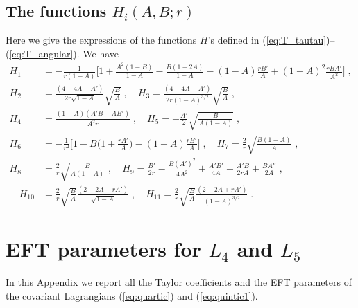 \documentclass[a4paper,11pt]{article}
\numberwithin{equation}{section}
\begin{document}
\subsection{The functions $H_i(A,B;r)$}\label{app:functions_H}
Here we give the expressions of the functions $H$'s defined in (\ref{eq:T_tautau})--(\ref{eq:T_angular}). We have 
\begin{align}
H_1 &=  -\frac{1}{r(1 - A)} \bigg[ 1 + \frac{A^2 (1 - B)}{1 - A} - \frac{B(1 - 2A)}{1 - A} - (1- A) \frac{r B'}{A} + (1 - A)^2 \frac{r B A'}{A^2}\bigg] \;, \nonumber \\
H_2 &= \frac{(4 -  4A - A')}{2 r \sqrt{1 - A}} \sqrt{\frac{B}{A}}  \;, \quad H_3 = \frac{(4 -  4A + A')}{2 r (1 - A)^{3/2}} \sqrt{\frac{B}{A}} \;,  \nonumber \\
H_4 &= \frac{(1 - A)(A'B - AB')}{A^2 r} \;, \quad H_5 = - \frac{A'}{2}\sqrt{\frac{B}{A(1 - A)}} \;, \\
H_6 &= -\frac{1}{r^2}\bigg[1 - B \bigg(1 + \frac{r A'}{A}\bigg) - (1 - A)\frac{r B'}{A}  \bigg] \;, \quad H_7 = \frac{2}{r} \sqrt{\frac{B(1 - A)}{A}} \;,  \nonumber \\
H_8 &= \frac{2}{r} \sqrt{\frac{B}{A(1 - A)}}  \;, \quad H_9 = \frac{B'}{2r} - \frac{B (A')^2}{4A^2} + \frac{A'B'}{4A} + \frac{A'B}{2 rA} + \frac{B A''}{2 A}  \;,   \nonumber \\  
\quad H_{10} &= \frac{2}{r} \sqrt{\frac{B}{A}} \frac{(2 - 2A - rA')}{\sqrt{1 - A}} \;, \quad
H_{11} = \frac{2}{r} \sqrt{\frac{B}{A}} \frac{(2 - 2A + rA')}{(1 - A)^{3/2}} \;. \nonumber
\end{align}


\section{EFT parameters for $L_4$ and $L_5$}\label{app:EFT_L4_L5}
In this Appendix we report all the Taylor coefficients and the EFT parameters of the covariant Lagrangians (\ref{eq:quartic}) and (\ref{eq:quintic1}).
\end{document}
